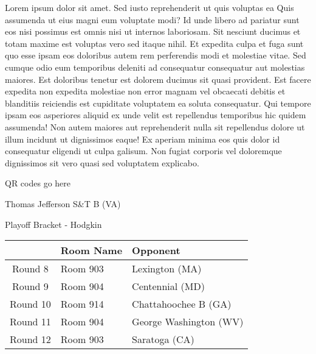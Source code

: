 \documentclass{article}%
\begin{document}
\vspace*{8pt}%
\linebreak%
\newline%
\newline%
Lorem ipsum dolor sit amet. Sed iusto reprehenderit ut quis voluptas ea Quis assumenda ut eius magni eum voluptate modi? Id unde libero ad pariatur sunt eos nisi possimus est omnis nisi ut internos laboriosam. Sit nesciunt ducimus et totam maxime est voluptas vero sed itaque nihil. Et expedita culpa et fuga sunt quo esse ipsam eos doloribus autem rem perferendis modi et molestiae vitae.\newline%
\newline%
Sed cumque odio eum temporibus deleniti ad consequatur consequatur aut molestias maiores. Est doloribus tenetur est dolorem ducimus sit quasi provident. Est facere expedita non expedita molestiae non error magnam vel obcaecati debitis et blanditiis reiciendis est cupiditate voluptatem ea soluta consequatur. Qui tempore ipsam eos asperiores aliquid ex unde velit est repellendus temporibus hic quidem assumenda!\newline%
\newline%
Non autem maiores aut reprehenderit nulla sit repellendus dolore ut illum incidunt ut dignissimos eaque! Ex aperiam minima eos quis dolor id consequatur eligendi ut culpa galisum. Non fugiat corporis vel doloremque dignissimos sit vero quasi sed voluptatem explicabo.\newline%
\newline%
%
\vspace*{30pt}%
\begin{center}%
\begin{Huge}%
QR codes go here%
\end{Huge}%
\end{center}%
\newpage%
\begin{center}%
\begin{Huge}%
Thomas Jefferson S\&T B (VA)%
\end{Huge}%
\vspace*{8pt}%
\linebreak%
\begin{Large}%
Playoff Bracket {-} Hodgkin%
\end{Large}%
\end{center}%
%
\begin{tabularx}{\textwidth}{|c|Y|Y|}%
\hline%
&Room Name&Opponent\\%
\hline%
Round 8&Room 903&Lexington (MA)\\%
Round 9&Room 904&Centennial (MD)\\%
Round 10&Room 914&Chattahoochee B (GA)\\%
Round 11&Room 904&George Washington (WV)\\%
Round 12&Room 903&Saratoga (CA)\\%
\hline%
\end{tabularx}%
\end{document}
